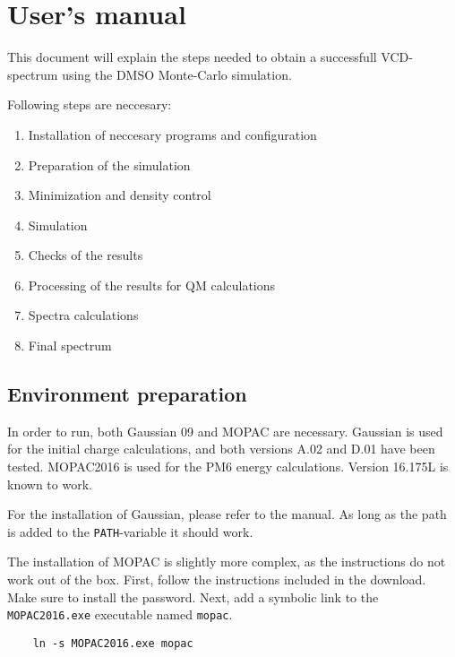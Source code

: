 \documentclass[a4paper,fleqn]{report}
\begin{document}
	
	\chapter{User's manual}

	
	This document will explain the steps needed to obtain a successfull VCD-spectrum using the DMSO Monte-Carlo simulation.
	
	Following steps are neccesary:
	\begin{enumerate}
		\setlength{\itemsep}{-1pt}
		\setlength{\parsep}{-1pt}
		\item Installation of neccesary programs and configuration
		\item Preparation of the simulation
		\item Minimization and density control
		\item Simulation
		\item Checks of the results
		\item Processing of the results for QM calculations
		\item Spectra calculations
		\item Final spectrum
	\end{enumerate}
	
	\section{Environment preparation}
	In order to run, both Gaussian 09 and MOPAC are necessary. Gaussian is used for the initial charge calculations, and both versions A.02 and D.01 have been tested.
	MOPAC2016 is used for the PM6 energy calculations. Version 16.175L is known to work.
	
	For the installation of Gaussian, please refer to the manual. As long as the path is added to the \verb|PATH|-variable it should work.
	
	The installation of MOPAC is slightly more complex, as the instructions do not work out of the box.
	First, follow the instructions included in the download. Make sure to install the password.
	Next, add a symbolic link to the \verb|MOPAC2016.exe| executable named \verb|mopac|.
	\begin{lstlisting}
	ln -s MOPAC2016.exe mopac
	\end{lstlisting}
	
	
	
\end{document}
